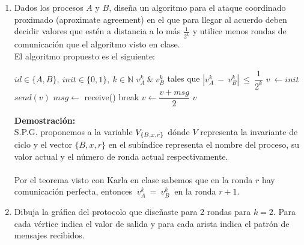 \documentclass[12pt,a4paper]{report}
\begin{document}
\begin{enumerate}
	\item {
		Dados los procesos $A$ y $B$, diseña un algoritmo para el ataque coordinado
		proximado (aproximate agreement) en el que para llegar al acuerdo deben
		decidir	valores que estén a distancia a lo más $\frac{1}{2^k}$ y utilice menos
		rondas de comunicación que el algoritmo visto en clase.\\

		El algoritmo propuesto es el siguiente:\\

		\begin{algorithmic}[1]
			\Require $id \in \{A,B\},\ init \in \{0, 1\},\ k \in \mathbb{N}$
			\Ensure $v_A^k\ \& \ v_B^k$ tales que $|v_A^k\ - \ v_B^k|\ \leq\ \dfrac{1}
				{2^k}$
				\State $v\ \leftarrow init$
					\State $send(v)$
					\State $msg \leftarrow$ receive()
							\State break
						\Else	
							\State $v \leftarrow \dfrac{v + msg}{2}$
						\EndIf
					\EndIf
				\EndFor
				\State \Return$v$
			\EndFunction
		\end{algorithmic}
	}
	

	\textbf{Demostración:}\\
	S.P.G. proponemos a la variable $V_{\{B, x, r\}}$ dónde $V$ representa la
	invariante de ciclo y el vector $\{B, x, r\}$ en el subíndice representa el
	nombre del proceso, su	valor actual y el número de ronda actual
	respectivamente.\\\\
	Por el teorema visto con Karla en clase sabemos que en la ronda $r$ hay
	comunicación perfecta, entonces $\ v_A^k\  =\  v_B^k\ $ en la ronda $r + 1$.\\
	


	\item {
		Dibuja la gráfica del protocolo que diseñaste para 2 rondas para $k = 2$.
		Para cada vértice indica el valor de salida y para cada arista indica el
		patrón de mensajes recibidos.\\\\

}
\end{enumerate}
\end{document}
